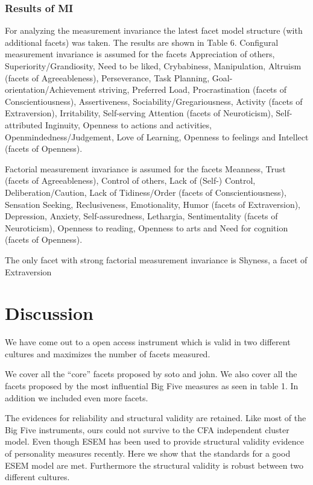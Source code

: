 \documentclass[man]{apa6}
\theoremstyle{definition}
\theoremstyle{definition}
\theoremstyle{definition}
\theoremstyle{remark}
\begin{document}
\hypertarget{results-of-mi}{%
\subsubsection{Results of MI}\label{results-of-mi}}

For analyzing the measurement invariance the latest facet model
structure (with additional facets) was taken. The results are shown in
Table 6. Configural measurement invariance is assumed for the facets
Appreciation of others, Superiority/Grandiosity, Need to be liked,
Crybabiness, Manipulation, Altruism (facets of Agreeableness),
Perseverance, Task Planning, Goal-orientation/Achievement striving,
Preferred Load, Procrastination (facets of Conscientiousness),
Assertiveness, Sociability/Gregariousness, Activity (facets of
Extraversion), Irritability, Self-serving Attention (facets of
Neuroticism), Self-attributed Inginuity, Openness to actions and
activities, Openmindedness/Judgement, Love of Learning, Openness to
feelings and Intellect (facets of Openness).

Factorial measurement invariance is assumed for the facets Meanness,
Trust (facets of Agreeableness), Control of others, Lack of (Self-)
Control, Deliberation/Caution, Lack of Tidiness/Order (facets of
Conscientiousness), Sensation Seeking, Reclusiveness, Emotionality,
Humor (facets of Extraversion), Depression, Anxiety, Self-assuredness,
Lethargia, Sentimentality (facets of Neuroticism), Openness to reading,
Openness to arts and Need for cognition (facets of Openness).

The only facet with strong factorial measurement invariance is Shyness,
a facet of Extraversion

\hypertarget{discussion}{%
\section{Discussion}\label{discussion}}

We have come out to a open access instrument which is valid in two
different cultures and maximizes the number of facets measured.

We cover all the \enquote{core} facets proposed by soto and john. We
also cover all the facets proposed by the most influential Big Five
measures as seen in table 1. In addition we included even more facets.

The evidences for reliability and structural validity are retained. Like
most of the Big Five instruments, ours could not survive to the CFA
independent cluster model. Even though ESEM has been used to provide
structural validity evidence of personality measures recently. Here we
show that the standards for a good ESEM model are met. Furthermore the
structural validity is robust between two different cultures.
\end{document}
